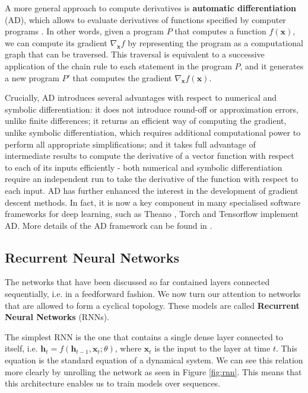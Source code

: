 \documentclass[pdftex,12pt,a4paper]{article}
\theoremstyle{definition}
\theoremstyle{remark}
\newcommand*{\V}[1]{\mathbf{#1}}%
\begin{document}
\par A more general approach to compute derivatives is \textbf{automatic differentiation} (AD), which allows to evaluate derivatives of functions specified by computer programs \cite{Kingma2014}. In other words, given a program $P$ that computes a function $f(\V{x})$, we can compute its gradient $\nabla_\V{x}f$ by representing the program as a computational graph that can be traversed. This traversal is equivalent to a successive application of the chain rule to each statement in the program $P$, and it generates a new program $P'$ that computes the gradient $\nabla_\V{x} f(\V{x})$.

\par Crucially, AD introduces several advantages with respect to numerical and symbolic differentiation: it does not introduce round-off or approximation errors, unlike finite differences; it returns an efficient way of computing the gradient, unlike symbolic differentiation, which requires additional computational power to perform all appropriate simplifications; and it takes full advantage of intermediate results to compute the derivative of a vector function with respect to each of its inputs efficiently - both numerical and symbolic differentiation require an independent run to take the derivative of the function with respect to each input. AD has further enhanced the interest in the development of gradient descent methods. In fact, it is now a key component in many specialised software frameworks for deep learning, such as Theano \cite{Bergstra2010,Bastien2012}, Torch \cite{Collobert2011} and Tensorflow \cite{tensorflow} implement AD. More details of the AD framework can be found in \cite{Bucker2005ADA}. 

\subsection{Recurrent Neural Networks}
The networks that have been discussed so far contained layers connected sequentially, i.e. in a feedforward fashion. We now turn our attention to networks that are allowed to form a cyclical topology. These models are called \textbf{Recurrent Neural Networks} (RNNs).

\par The simplest RNN is the one that contains a single dense layer connected to itself, i.e. $\V{h}_t = f(\V{h}_{t-1}, \V{x}_t ; \theta)$, where $\V{x}_t$ is the input to the layer at time $t$. This equation is the standard equation of a dynamical system. We can see this relation more clearly by unrolling the network as seen in Figure \ref{fig:rnn}. This means that this architecture enables us to train models over sequences.
\end{document}
